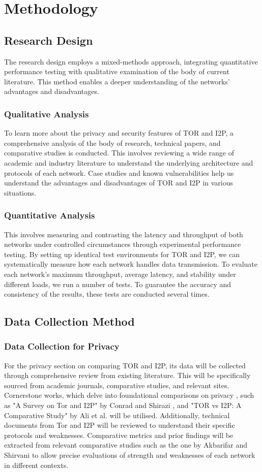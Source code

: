 \documentclass[12pt,conference]{IEEEtran}
\begin{document}
\section{Methodology}
\subsection{Research Design}
The research design employs a mixed-methods approach, integrating quantitative performance testing with qualitative examination of the body of current literature. This method enables a deeper understanding of the networks' advantages and disadvantages.

\subsubsection{Qualitative Analysis} To learn more about the privacy and security features of TOR and I2P, a comprehensive analysis of the body of research, technical papers, and comparative studies is conducted. This involves reviewing a wide range of academic and industry literature to understand the underlying architecture and protocols of each network. Case studies and known vulnerabilities help us understand the advantages and disadvantages of TOR and I2P in various situations. 

\subsubsection{Quantitative Analysis} This involves measuring and contrasting the latency and throughput of both networks under controlled circumstances through experimental performance testing. By setting up identical test environments for TOR and I2P, we can systematically measure how each network handles data transmission. To evaluate each network's maximum throughput, average latency, and stability under different loads, we run a number of tests. To guarantee the accuracy and consistency of the results, these tests are conducted several times.
\subsection{Data Collection Method}
\subsubsection{Data Collection for Privacy}
For the privacy section on comparing TOR and I2P, its data will be collected through comprehensive review from existing literature. This will be specifically sourced from academic journals, comparative studies, and relevant sites. Cornerstone works, which delve into foundational comparisons on privacy , such as "A Survey on Tor and I2P" by Conrad and Shirazi \cite{aSurveyOnTORAndI2P}, and "TOR vs I2P: A Comparative Study" by Ali et al. \cite{TORVsI2P} will be utilised. Additionally, technical documents from Tor and I2P will be reviewed to understand their specific protocols and weaknesses. Comparative metrics and prior findings will be extracted from relevant comparative studies such as the one by Akbarifar and Shirvani \cite{aComparativeStudyOnAnonymizingNetworks} to allow precise evaluations of strength and weaknesses of each network in different contexts. 
\end{document}
